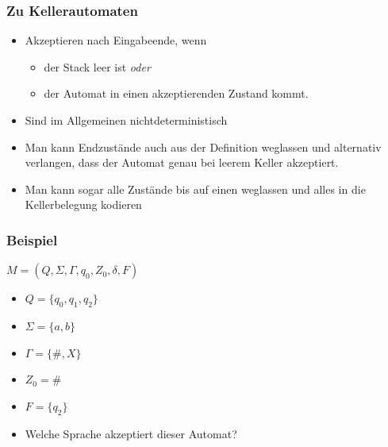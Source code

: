\begin{frame}
\frametitle{Zu Kellerautomaten}
\begin{itemize}
\item Akzeptieren nach Eingabeende, wenn \begin{itemize}
	\item der Stack leer ist \emph{oder}
	\item der Automat in einen akzeptierenden Zustand kommt.
\end{itemize}
\item Sind im Allgemeinen nichtdeterministisch
\item Man kann Endzustände auch aus der Definition weglassen und alternativ verlangen, dass der Automat genau bei leerem Keller akzeptiert.
\item Man kann sogar alle Zustände bis auf einen weglassen und alles in die Kellerbelegung kodieren
\end{itemize}
\end{frame}

\begin{frame}
\frametitle{Beispiel}
$M = (Q, \Sigma, \Gamma, q_0, Z_0, \delta, F)$
\begin{itemize}
\item $Q = \{q_0, q_1, q_2\}$
\item $\Sigma = \{a,b\}$
\item $\Gamma = \{\#,X\}$
\item $Z_0 = \#$
\item $F = \{q_2\}$
\end{itemize}
\begin{figure}
\end{figure}

\begin{itemize}
\item Welche Sprache akzeptiert dieser Automat?
\end{itemize}
\end{frame}


